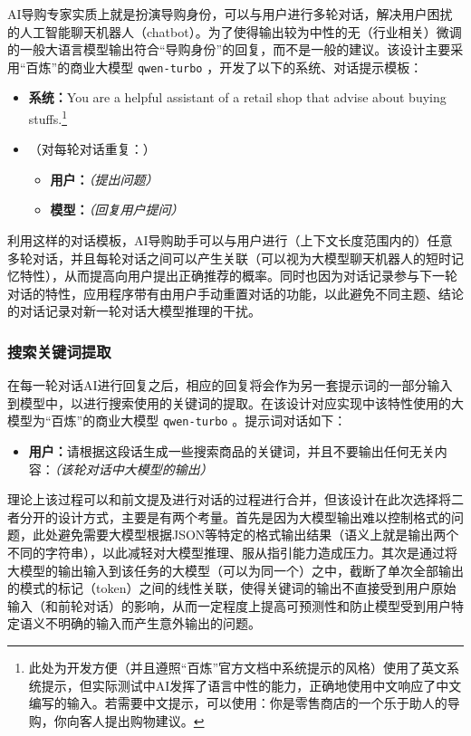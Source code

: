 AI导购专家实质上就是扮演导购身份，可以与用户进行多轮对话，解决用户困扰的人工智能聊天机器人（chatbot）。为了使得输出较为中性的无（行业相关）微调的一般大语言模型输出符合“导购身份”的回复，而不是一般的建议。该设计主要采用“百炼”的商业大模型 \verb|qwen-turbo| ，开发了以下的系统、对话提示模板：

\begin{itemize}
    \item[] \textbf{系统：}You are a helpful assistant of a retail shop that advise about buying stuffs.\footnote{此处为开发方便（并且遵照“百炼”官方文档中系统提示的风格）使用了英文系统提示，但实际测试中AI发挥了语言中性的能力，正确地使用中文响应了中文编写的输入。若需要中文提示，可以使用：你是零售商店的一个乐于助人的导购，你向客人提出购物建议。}
    \item[] （对每轮对话重复：）
    \begin{itemize}
        \item[] \textbf{用户：}\textit{（提出问题）}
        \item[] \textbf{模型：}\textit{（回复用户提问）}
    \end{itemize}
\end{itemize}

利用这样的对话模板，AI导购助手可以与用户进行（上下文长度范围内的）任意多轮对话，并且每轮对话之间可以产生关联（可以视为大模型聊天机器人的短时记忆特性），从而提高向用户提出正确推荐的概率。同时也因为对话记录参与下一轮对话的特性，应用程序带有由用户手动重置对话的功能，以此避免不同主题、结论的对话记录对新一轮对话大模型推理的干扰。

\subsubsection{搜索关键词提取}

在每一轮对话AI进行回复之后，相应的回复将会作为另一套提示词的一部分输入到模型中，以进行搜索使用的关键词的提取。在该设计对应实现中该特性使用的大模型为“百炼”的商业大模型 \verb|qwen-turbo| 。提示词对话如下：

\begin{itemize}
    \item[] \textbf{用户：}请根据这段话生成一些搜索商品的关键词，并且不要输出任何无关内容：\textit{（该轮对话中大模型的输出）}
\end{itemize}

理论上该过程可以和前文提及进行对话的过程进行合并，但该设计在此次选择将二者分开的设计方式，主要是有两个考量。首先是因为大模型输出难以控制格式的问题，此处避免需要大模型根据JSON等特定的格式输出结果（语义上就是输出两个不同的字符串），以此减轻对大模型推理、服从指引能力造成压力。其次是通过将大模型的输出输入到该任务的大模型（可以为同一个）之中，截断了单次全部输出的模式的标记（token）之间的线性关联，使得关键词的输出不直接受到用户原始输入（和前轮对话）的影响，从而一定程度上提高可预测性和防止模型受到用户特定语义不明确的输入而产生意外输出的问题。

